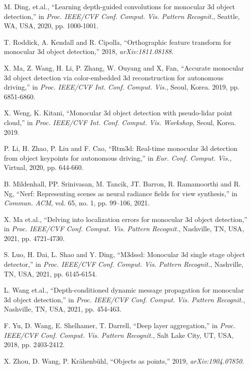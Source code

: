 \documentclass[journal]{IEEEtran}
\begin{document}
\begin{thebibliography}{1}
		M. Ding, et.al., “Learning depth-guided convolutions for monocular 3d object detection,” in \textit{Proc. IEEE/CVF Conf. Comput. Vis. Pattern Recognit.}, Seattle, WA, USA, 2020, pp. 1000-1001.
		
		T. Roddick, A. Kendall and R. Cipolla, “Orthographic feature transform for monocular 3d object detection,” 2018, \textit{arXiv:1811.08188}.
		
		X. Ma, Z. Wang, H. Li, P. Zhang, W. Ouyang and X, Fan, “Accurate monocular 3d object detection via color-embedded 3d reconstruction for autonomous driving,” in \textit{Proc. IEEE/CVF Int. Conf. Comput. Vis.}, Seoul, Korea. 2019, pp. 6851-6860.
		
		X. Weng, K. Kitani, “Monocular 3d object detection with pseudo-lidar point cloud,” in \textit{Proc. IEEE/CVF Int. Conf. Comput. Vis. Workshop}, Seoul, Korea. 2019.
		
		P. Li, H. Zhao, P. Liu and F. Cao, “Rtm3d: Real-time monocular 3d detection from object keypoints for autonomous driving,” in \textit{Eur. Conf. Comput. Vis.}, Virtual, 2020, pp. 644-660.
		
		B. Mildenhall, PP. Srinivasan, M. Tancik, JT. Barron, R. Ramamoorthi and R. Ng, “Nerf: Representing scenes as neural radiance fields for view synthesis,” in \textit{Commun. ACM}, vol. 65, no. 1, pp. 99–106, 2021.
		
		X. Ma et.al., “Delving into localization errors for monocular 3d object detection,” in \textit{Proc. IEEE/CVF Conf. Comput. Vis. Pattern Recognit.}, Nashville, TN, USA, 2021, pp. 4721-4730.
		
		S. Luo, H. Dai, L. Shao and Y. Ding, “M3dssd: Monocular 3d single stage object detector,” in \textit{Proc. IEEE/CVF Conf. Comput. Vis. Pattern Recognit.}, Nashville, TN, USA, 2021, pp. 6145-6154.
		
		L. Wang et.al., “Depth-conditioned dynamic message propagation for monocular 3d object detection,” in \textit{Proc. IEEE/CVF Conf. Comput. Vis. Pattern Recognit.}, Nashville, TN, USA, 2021, pp. 454-463.
		
		F. Yu, D. Wang, E. Shelhamer, T. Darrell, “Deep layer aggregation,” in \textit{Proc. IEEE/CVF Conf. Comput. Vis. Pattern Recognit.}, Salt Lake City, UT, USA, 2018, pp.  2403-2412.
		
		X. Zhou, D. Wang, P. Krähenbühl, “Objects as points,” 2019, \textit{arXiv:1904.07850}.
		

\end{thebibliography}
\end{document}
